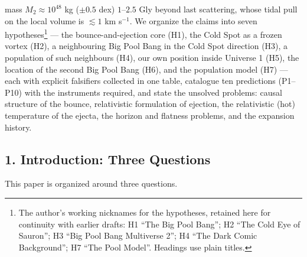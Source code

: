\documentclass[
]{article}
\begin{document}
mass \(M_2 \approx 10^{48}\) kg (\(\pm 0.5\) dex) \(1\)--\(2.5\) Gly
beyond last scattering, whose tidal pull on the local volume is
\(\lesssim 1\) km s\(^{-1}\). We organize the claims into seven
hypotheses\footnote{The author's working nicknames for the hypotheses,
  retained here for continuity with earlier drafts: H1 ``The Big Pool
  Bang''; H2 ``The Cold Eye of Sauron''; H3 ``Big Pool Bang Multiverse
  2''; H4 ``The Dark Comic Background''; H7 ``The Pool Model''. Headings
  use plain titles.} --- the bounce-and-ejection core (H1), the Cold
Spot as a frozen vortex (H2), a neighbouring Big Pool Bang in the Cold
Spot direction (H3), a population of such neighbours (H4), our own
position inside Universe 1 (H5), the location of the second Big Pool
Bang (H6), and the population model (H7) --- each with explicit
falsifiers collected in one table, catalogue ten predictions (P1--P10)
with the instruments required, and state the unsolved problems: causal
structure of the bounce, relativistic formulation of ejection, the
relativistic (hot) temperature of the ejecta, the horizon and flatness
problems, and the expansion history.

\hypertarget{introduction-three-questions}{%
\subsection{\texorpdfstring{\textbf{1. Introduction: Three
Questions}}{1. Introduction: Three Questions}}\label{introduction-three-questions}}

This paper is organized around three questions.
\end{document}
